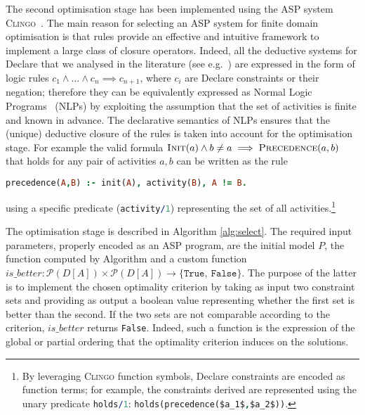 The second optimisation stage has been implemented using the \ac{ASP} system \textsc{Clingo}~\cite{clingo:2019}. The main reason for selecting an \ac{ASP} system for finite domain optimisation is that rules provide an effective and intuitive framework to implement a large class of closure operators. Indeed, all the deductive systems for Declare that we analysed in the literature (see e.g.~\cite{2016-Bernardi,2017-DiCiccio}) are expressed in the form of logic rules $c_1\land\ldots\land c_n\implies c_{n+1}$, where $c_i$ are Declare constraints or their negation; therefore they can be equivalently expressed as Normal Logic Programs~\cite{2008-Lifschitz} (NLPs) by exploiting the assumption that the set of activities is finite and known in advance. The declarative semantics of NLPs ensures that the (unique) deductive closure of the rules is taken into account for the optimisation stage.
%
For example the valid formula $\textsc{Init}(a)\land b\neq a\implies\textsc{Precedence}(a,b)$ that holds for any pair of activities $a, b$ can be written as the rule
\begin{lstlisting}[language=prolog, breaklines=true]
precedence(A,B) :- init(A), activity(B), A != B.
\end{lstlisting}
using a specific predicate (\lstinline[language=prolog]$activity/1$) representing the set of all activities.\footnote{By leveraging \textsc{Clingo} function symbols, Declare constraints are encoded as function terms; for example, the constraints derived are represented using the unary predicate \lstinline[language=prolog]$holds/1$: \lstinline[language=prolog,mathescape=true]|holds(precedence($a_1$,$a_2$))|.}


The optimisation stage is described in Algorithm \ref{alg:select}. The required input parameters, properly encoded as an \ac{ASP} program, are the initial model $P$, the \textit{\sheriff} function computed by Algorithm \label{alg:cand} and a custom function ${is\_better}:\mathcal{P}({D[A]})\times\mathcal{P}({D[A]})\rightarrow \{\texttt{True},\ \texttt{False}\}$. The purpose of the latter is to implement the chosen optimality criterion by taking as input two constraint sets and providing as output a boolean value representing whether the first set is better than the second. If the two sets are not comparable according to the criterion, ${is\_better}$ returns \texttt{False}. Indeed, such a function is the expression of the global or partial ordering that the optimality criterion induces on the solutions. 


